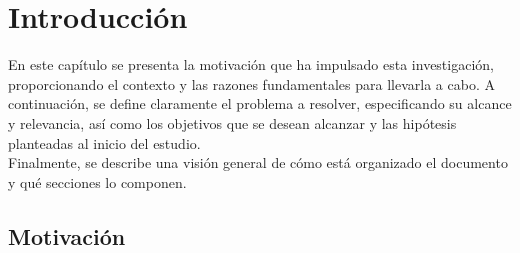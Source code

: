 \documentclass[a4paper, 12pt]{book}
\begin{document}
\tableofcontents 
\cleardoublepage
\listoffigures %



\cleardoublepage
\chapter{Introducción}
\label{chap:introducción}
\label{sec:intro} %

En este capítulo se presenta la motivación que ha impulsado esta investigación,
proporcionando el contexto y las razones fundamentales para llevarla a cabo. A continuación, 
se define claramente el problema a resolver, especificando su alcance y relevancia, así como 
los objetivos que se desean alcanzar y las hipótesis planteadas al inicio del estudio.
\\Finalmente, se describe una visión general de cómo está organizado el documento y qué secciones lo componen.

\section{Motivación}
\label{sec:motivación}
\end{document}
